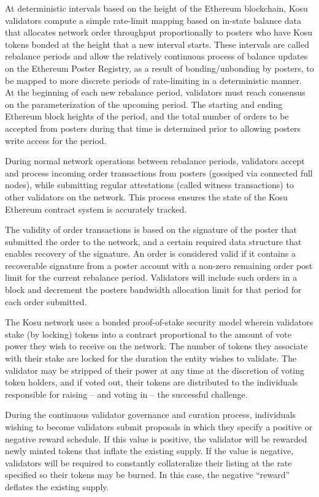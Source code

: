 \documentclass[10pt]{article}
\begin{document}
At deterministic intervals based on the height of the Ethereum blockchain, Kosu validators compute a simple rate-limit mapping based on in-state balance data that allocates network order throughput proportionally to posters who have Kosu tokens bonded at the height that a new interval starts. These intervals are called rebalance periods and allow the relatively continuous process of balance updates on the Ethereum Poster Registry, as a result of bonding/unbonding by posters, to be mapped to more discrete periods of rate-limiting in a deterministic manner. At the beginning of each new rebalance period, validators must reach consensus on the parameterization of the upcoming period. The starting and ending Ethereum block heights of the period, and the total number of orders to be accepted from posters during that time is determined prior to allowing posters write access for the period.
\medskip

During normal network operations between rebalance periods, validators accept and process incoming order transactions from posters (gossiped via connected full nodes), while submitting regular attestations (called witness transactions) to other validators on the network. This process ensures the state of the Kosu Ethereum contract system is accurately tracked.
\medskip

The validity of order transactions is based on the signature of the poster that submitted the order to the network, and a certain required data structure that enables recovery of the signature. An order is considered valid if it contains a recoverable signature from a poster account with a non-zero remaining order post limit for the current rebalance period. Validators will include such orders in a block and decrement the posters bandwidth allocation limit for that period for each order submitted. 
\medskip

The Kosu network uses a bonded proof-of-stake security model wherein validators stake (by locking) tokens into a contract proportional to the amount of vote power they wish to receive on the network. The number of tokens they associate with their stake are locked for the duration the entity wishes to validate. The validator may be stripped of their power at any time at the discretion of voting token holders, and if voted out, their tokens are distributed to the individuals responsible for raising – and voting in – the successful challenge. 
\medskip

During the continuous validator governance and curation process, individuals wishing to become validators submit proposals in which they specify a positive or negative reward schedule. If this value is positive, the validator will be rewarded newly minted tokens that inflate the existing supply. If the value is negative, validators will be required to constantly collateralize their listing at the rate specified so their tokens may be burned. In this case, the negative ``reward'' deflates the existing supply. 
\medskip
\end{document}
